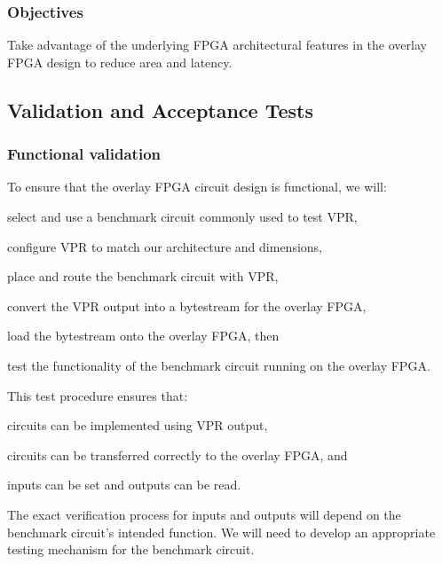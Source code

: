 \subsubsection{Objectives}

\begin{itemlist}
	\item Take advantage of the underlying FPGA architectural features in the overlay FPGA design to reduce area and latency.
\end{itemlist}


\subsection{Validation and Acceptance Tests}


\subsubsection{Functional validation}

To ensure that the overlay FPGA circuit design is functional, we will:
\begin{enumeration}
	\item select and use a benchmark circuit commonly used to test VPR,
	\item configure VPR to match our architecture and dimensions,
	\item place and route the benchmark circuit with VPR,
	\item convert the VPR output into a bytestream for the overlay FPGA,
	\item load the bytestream onto the overlay FPGA, then 
	\item test the functionality of the benchmark circuit running on the overlay FPGA.
\end{enumeration}
This test procedure ensures that:
\begin{itemlist}
	\item circuits can be implemented using VPR output,
	\item circuits can be transferred correctly to the overlay FPGA, and
	\item inputs can be set and outputs can be read.
\end{itemlist}
The exact verification process for inputs and outputs will depend on the benchmark circuit's intended function.
We will need to develop an appropriate testing mechanism for the benchmark circuit.


